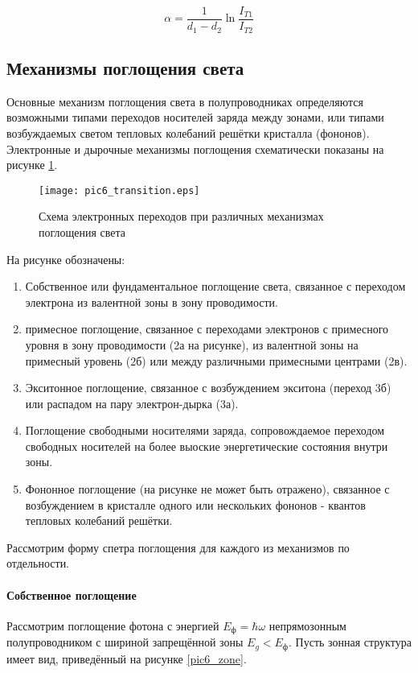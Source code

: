 \begin{equation}
\alpha = \frac{1}{d_{1}-d_{2}} \ln \frac{I_{T1}}{I_{T2}}
\end{equation}

\subsection{Механизмы поглощения света}
Основные механизм поглощения света в полупроводниках определяются возможными типами переходов носителей заряда между зонами, или типами возбуждаемых светом тепловых колебаний решётки кристалла (фононов). Электронные и дырочные механизмы поглощения схематически показаны на рисунке \ref{pic6_transition}.

\begin{figure}[h!]\centering
\texttt{[image: pic6\_transition.eps]}
\caption{Схема электронных переходов при различных механизмах поглощения света}
\label{pic6_transition}
\end{figure}

На рисунке обозначены:

\begin{enumerate}
\item Собственное или фундаментальное поглощение света, связанное с переходом электрона из валентной зоны в зону проводимости.
\item примесное поглощение, связанное с переходами электронов с примесного уровня в зону проводимости (2а на рисунке), из валентной зоны на примесный уровень (2б) или между различными примесными центрами (2в).
\item Экситонное поглощение, связанное с возбуждением экситона (переход 3б) или распадом на пару электрон-дырка (3а).
\item Поглощение свободными носителями заряда, сопровождаемое переходом свободных носителей на более выоские энергетические состояния внутри зоны.
\item Фононное поглощение (на рисунке не может быть отражено), связанное с возбуждением в кристалле одного или нескольких фононов - квантов тепловых колебаний решётки.
\end{enumerate}

Рассмотрим форму спетра поглощения для каждого из механизмов по отдельности.

\paragraph{Собственное поглощение}
Рассмотрим поглощение фотона с энергией $E_{\text{ф}} = \hbar \omega$ непрямозонным полупроводником с шириной запрещённой зоны $E_{g} < E_{\text{ф}}$. Пусть зонная структура имеет вид, приведённый на рисунке \ref{pic6_zone}.

